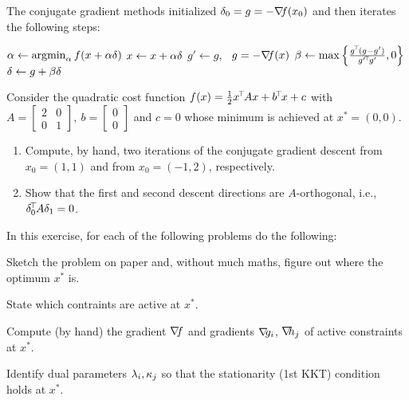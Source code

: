 
The conjugate gradient methods initialized $\delta_0=g=-{\nabla_{\!\!}} f(x_0)$ and then iterates the following steps:\\
\begin{algo}
\State $\alpha \gets \operatorname*{argmin}_\alpha f(x+\alpha \delta)$ 
\State $x \gets x + \alpha \delta$
\State $g' \gets g$,~ $g = -{\nabla_{\!\!}} f(x)$ 
\State $\beta \gets \max\left\{\frac{g^{\!\top\!}(g - g')}{g'^{\!\top\!} g'},0\right\}$
\State $\delta \gets g + \beta \delta$ 
\end{algo}

Consider the quadratic cost function $f(x) = \frac{1}{2}
x^{\!\top\!} A x + b^{\!\top\!} x + c$ with $A=\begin{bmatrix}2&0\\0&1\end{bmatrix},~b=\begin{bmatrix}0\\0\end{bmatrix}$ and $c=0$ whose minimum is achieved at $x^*=(0,0)$.
\begin{enumerate}
\item Compute, by hand, two iterations of the conjugate gradient descent from $x_0 = (1,1)$ and from $x_0 = (-1,2)$, respectively.
\item Show that the first and second descent directions are $A$-orthogonal, i.e., $\delta_0^{\!\top\!} A \delta_1 = 0$.
\end{enumerate}




In this exercise, for each of the following problems do the following:
\begin{items}
	\item Sketch the problem on paper
	and, without much maths, figure out where the optimum $x^*$ is.
	\item State which contraints are active at $x^*$.
	\item Compute (by hand) the gradient ${\nabla_{\!\!}} f$ and gradients ${\nabla_{\!\!}}
	g_i$, ${\nabla_{\!\!}} h_j$ of active constraints at $x^*$.
	\item Identify dual parameters $\lambda_i,\kappa_j$ so that the
	stationarity (1st KKT) condition holds at $x^*$.
\end{items}

